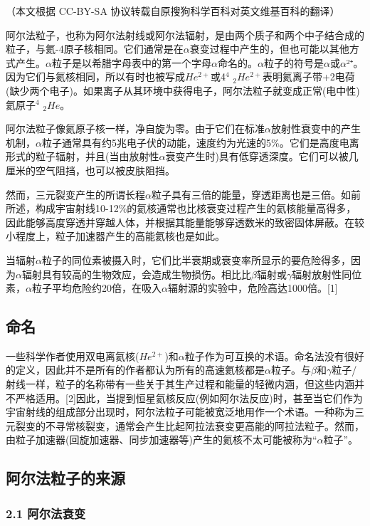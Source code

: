 
（本文根据 CC-BY-SA 协议转载自原搜狗科学百科对英文维基百科的翻译）

阿尔法粒子，也称为阿尔法射线或阿尔法辐射，是由两个质子和两个中子结合成的粒子，与氦-4原子核相同。它们通常是在$\alpha$衰变过程中产生的，但也可能以其他方式产生。$\alpha$粒子是以希腊字母表中的第一个字母$\alpha$命名的。$\alpha$粒子的符号是$\alpha$或$\alpha$²⁺。因为它们与氦核相同，所以有时也被写成$He^{2+}$或4$^4$ $_2He^{2+}$表明氦离子带+2电荷(缺少两个电子)。如果离子从其环境中获得电子，阿尔法粒子就变成正常(电中性)氦原子$^4$ $_2He$。

阿尔法粒子像氦原子核一样，净自旋为零。由于它们在标准$\alpha$放射性衰变中的产生机制，$\alpha$粒子通常具有约5兆电子伏的动能，速度约为光速的5\%。它们是高度电离形式的粒子辐射，并且(当由放射性$\alpha$衰变产生时)具有低穿透深度。它们可以被几厘米的空气阻挡，也可以被皮肤阻挡。

然而，三元裂变产生的所谓长程$\alpha$粒子具有三倍的能量，穿透距离也是三倍。如前所述，构成宇宙射线10-12\%的氦核通常也比核衰变过程产生的氦核能量高得多，因此能够高度穿透并穿越人体，并根据其能量能够穿透数米的致密固体屏蔽。在较小程度上，粒子加速器产生的高能氦核也是如此。

当辐射$\alpha$粒子的同位素被摄入时，它们比半衰期或衰变率所显示的要危险得多，因为$\alpha$辐射具有较高的生物效应，会造成生物损伤。相比比$\beta$辐射或$\gamma$辐射放射性同位素，$\alpha$粒子平均危险约20倍，在吸入$\alpha$辐射源的实验中，危险高达1000倍。[1]

\subsection{命名}
一些科学作者使用双电离氦核($He^{2+}$)和$\alpha$粒子作为可互换的术语。命名法没有很好的定义，因此并不是所有的作者都认为所有的高速氦核都是$\alpha$粒子。与$\beta$和$\gamma$粒子/射线一样，粒子的名称带有一些关于其生产过程和能量的轻微内涵，但这些内涵并不严格适用。[2]因此，当提到恒星氦核反应(例如阿尔法反应)时，甚至当它们作为宇宙射线的组成部分出现时，阿尔法粒子可能被宽泛地用作一个术语。一种称为三元裂变的不寻常核裂变，通常会产生比起阿拉法衰变更高能的阿拉法粒子。然而，由粒子加速器(回旋加速器、同步加速器等)产生的氦核不太可能被称为“$\alpha$粒子”。

\subsection{阿尔法粒子的来源}
\subsubsection{2.1 阿尔法衰变}
